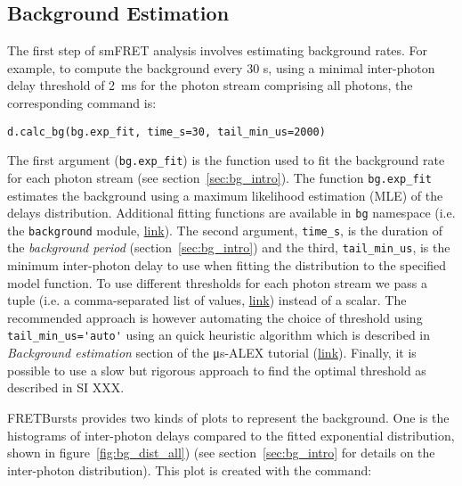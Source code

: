 \subsection{Background Estimation}
\label{sec:bg_calc}

The first step of smFRET analysis involves estimating background rates.
For example, to compute the background every 30 s, using a minimal inter-photon
delay threshold of 2~ms for the photon stream comprising all photons, the corresponding command is:

\begin{lstlisting}
d.calc_bg(bg.exp_fit, time_s=30, tail_min_us=2000)
\end{lstlisting}

The first argument (\verb|bg.exp_fit|) is the function used to fit the
background rate for each photon stream (see section~\ref{sec:bg_intro}).
The function
\verb|bg.exp_fit| estimates the background using a maximum likelihood estimation
(MLE) of the delays distribution.
Additional fitting functions are available in
\verb|bg| namespace 
(i.e. the \verb|background| module, \href{http://fretbursts.readthedocs.org/en/latest/background.html}
{link}). The second argument, \verb|time_s|, is the duration of the
\textit{background period} (section~\ref{sec:bg_intro}) and the third, \verb|tail_min_us|,
is the minimum inter-photon delay to use when fitting the distribution to the specified model function.
To use different thresholds for each photon stream we pass a
tuple (i.e. a comma-separated list of values, \href{https://docs.python.org/3.5/tutorial/datastructures.html#tuples-and-sequences}{link}) instead of a scalar.
The recommended approach is however automating the choice of threshold using
\verb|tail_min_us='auto'| using an quick heuristic algorithm which is described in 
\textit{Background estimation} section of the μs-ALEX tutorial 
(\href{http://nbviewer.jupyter.org/github/tritemio/FRETBursts_notebooks/blob/master/notebooks/FRETBursts%20-%20us-ALEX%20smFRET%20burst%20analysis.ipynb#Background-estimation}{link}).
Finally, it is possible to use a slow but rigorous approach to find the optimal
threshold as described in SI XXX.

FRETBursts provides two kinds of plots to represent the background. One is the histograms
of inter-photon delays compared to the fitted exponential distribution, shown in 
figure~\ref{fig:bg_dist_all}) (see section~\ref{sec:bg_intro} for details on the inter-photon distribution). 
This plot is created with the command:

